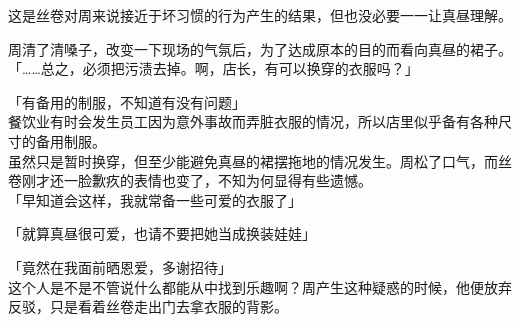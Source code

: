 这是丝卷对周来说接近于坏习惯的行为产生的结果，但也没必要一一让真昼理解。

周清了清嗓子，改变一下现场的气氛后，为了达成原本的目的而看向真昼的裙子。\\

「……总之，必须把污渍去掉。啊，店长，有可以换穿的衣服吗？」

「有备用的制服，不知道有没有问题」\\

餐饮业有时会发生员工因为意外事故而弄脏衣服的情况，所以店里似乎备有各种尺寸的备用制服。\\

虽然只是暂时换穿，但至少能避免真昼的裙摆拖地的情况发生。周松了口气，而丝卷刚才还一脸歉疚的表情也变了，不知为何显得有些遗憾。\\

「早知道会这样，我就常备一些可爱的衣服了」

「就算真昼很可爱，也请不要把她当成换装娃娃」

「竟然在我面前晒恩爱，多谢招待」\\

这个人是不是不管说什么都能从中找到乐趣啊？周产生这种疑惑的时候，他便放弃反驳，只是看着丝卷走出门去拿衣服的背影。
